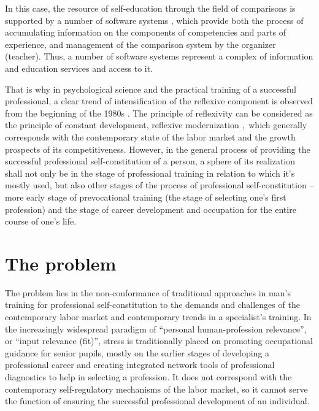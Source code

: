 \documentclass[conference]{IEEEtran}
\begin{document}
In this case, the resource of self-education through the field of comparisons is supported by a number of software systems \cite{b22,b23}, which provide both the process of accumulating information on the components of competencies and parts of experience, and management of the comparison system by the organizer (teacher). Thus, a number of software systems represent a complex of information and education services and access to it.

That is why in psychological science and the practical training of a successful professional, a clear trend of intensification of the reflexive component is observed from the beginning of the 1980s \cite{b16,b3,b17}. The principle of reflexivity can be considered as the principle of constant development, reflexive modernization \cite{b1,b2}, which generally corresponds with the contemporary state of the labor market and the growth prospects of its competitiveness. However, in the general process of providing the successful professional self-constitution of a person, a sphere of its realization shall not only be in the stage of professional training in relation to which it’s mostly used, but also other stages of the process of professional self-constitution – more early stage of prevocational training (the stage of selecting one’s first profession) and the stage of career development and occupation for the entire course of one’s life. 

\section{The problem}

The problem lies in the non-conformance of traditional approaches in man’s training for professional self-constitution to the demands and challenges of the contemporary labor market and contemporary trends in a specialist’s training. In the increasingly widespread paradigm of “personal human-profession relevance”, or “input relevance (fit)”, stress is traditionally placed on promoting occupational guidance for senior pupils, mostly on the earlier stages of developing a professional career and creating integrated network tools of professional diagnostics to help in selecting a profession. It does not correspond with the contemporary self-regulatory mechanisms of the labor market, so it cannot serve the function of ensuring the successful professional development of an individual. 
\end{document}
